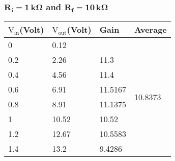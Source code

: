 \documentclass[12pt]{article}
\begin{document}
\subsubsection{$\mathbf{R_i = 1\, k \Omega}$ and $\mathbf{R_f = 10\, k \Omega}$}

\begin{table}[H]
	\centering
	\begin{tabular}{|l|l|l|l|}
		\hline
		$\mathrm{V_{in}}$(Volt) & $\mathrm{V_{out}}$(Volt) & Gain             & Average                            \\ \hline \hline
		0            & 0.12          &         & \multirow{8}{*}{10.8373} \\ \cline{1-3}
		0.2          & 2.26          & 11.3    &                                   \\ \cline{1-3}
		0.4          & 4.56          & 11.4    &                                   \\ \cline{1-3}
		0.6          & 6.91          & 11.5167 &                                   \\ \cline{1-3}
		0.8          & 8.91          & 11.1375 &                                   \\ \cline{1-3}
		1            & 10.52         & 10.52   &                                   \\ \cline{1-3}
		1.2          & 12.67         & 10.5583 &                                   \\ \cline{1-3}
		1.4          & 13.2          & 9.4286  &                                   \\ \hline
	\end{tabular}
\end{table}
\end{document}
